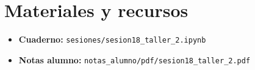 \documentclass[12pt, oneside]{article}
\begin{document}
\newpage

\section{Materiales y recursos}

\begin{itemize}
  \item \textbf{Cuaderno:} \texttt{sesiones/sesion18\_taller\_2.ipynb}
  \item \textbf{Notas alumno:} \texttt{notas\_alumno/pdf/sesion18\_taller\_2.pdf}
\end{itemize}
\end{document}
